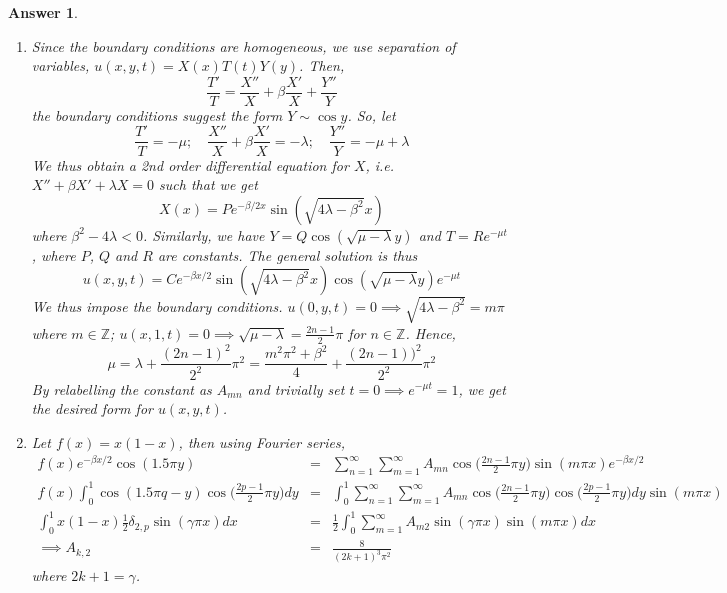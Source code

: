 \documentclass[a4paper]{article}
\newtheorem{ans}{Answer}[section]
\theoremstyle{new}
\begin{document}
\begin{ans}\leavevmode
\begin{enumerate}[label=(\alph*)]
    \item Since the boundary conditions are homogeneous, we use separation of variables, $u(x,y,t)=X(x)T(t)Y(y)$. Then,
$$\frac{T'}{T}=\frac{X''}{X}+\beta\frac{X'}{X}+\frac{Y''}{Y}$$
the boundary conditions suggest the form $Y\sim\cos y$. So, let
$$\frac{T'}{T}=-\mu;\quad \frac{X''}{X}+\beta\frac{X'}{X}=-\lambda;\quad \frac{Y''}{Y}=-\mu+\lambda$$
We thus obtain a 2nd order differential equation for $X$, i.e. $X''+\beta X'+\lambda X=0$ such that we get
$$X(x)=Pe^{-\beta/2x}\sin(\sqrt{4\lambda-\beta^2}x)$$
where $\beta^2-4\lambda<0$. Similarly, we have $Y=Q\cos(\sqrt{\mu-\lambda}y)$ and $T=Re^{-\mu t}$, where $P$, $Q$ and $R$ are constants. The general solution is thus
$$u(x,y,t)=Ce^{-\beta x/2}\sin(\sqrt{4\lambda-\beta^2}x)\cos(\sqrt{\mu-\lambda}y)e^{-\mu t}$$
We thus impose the boundary conditions. $u(0,y,t)=0\implies\sqrt{4\lambda-\beta^2}=m\pi$ where $m\in\mathbb{Z}$; $u(x,1,t)=0\implies\sqrt{\mu-\lambda}=\frac{2n-1}{2}\pi$ for $n\in\mathbb{Z}$. Hence, $$\mu=\lambda+\frac{(2n-1)^2}{2^2}\pi^2=\frac{m^2\pi^2+\beta^2}{4}+\frac{(2n-1))^2}{2^2}\pi^2$$ By relabelling the constant as $A_{mn}$ and trivially set $t=0\implies e^{-\mu t}=1$, we get the desired form for $u(x,y,t)$.
\item Let $f(x)=x(1-x)$, then using Fourier series,
\begin{eqnarray}
f(x)e^{-\beta x/2}\cos(1.5\pi y)&=&\sum_{n=1}^\infty\sum_{m=1}^\infty A_{mn}\cos\bigg(\frac{2n-1}{2}\pi y\bigg)\sin(m\pi x)e^{-\beta x/2}\nonumber\\
f(x)\int_0^1\cos(1.5\pi q-y)\cos\bigg(\frac{2p-1}{2}\pi y\bigg)dy&=&\int_0^1\sum_{n=1}^\infty\sum_{m=1}^\infty A_{mn}\cos\bigg(\frac{2n-1}{2}\pi y\bigg)\cos\bigg(\frac{2p-1}{2}\pi y\bigg)dy\sin(m\pi x)\nonumber\\
\int_0^1x(1-x)\frac{1}{2}\delta_{2,p}\sin(\gamma\pi x)dx&=&\frac{1}{2}\int_0^1\sum_{m=1}^\infty A_{m2}\sin(\gamma \pi x)\sin(m\pi x)dx\nonumber\\\implies A_{k,2}&=&\frac{8}{(2k+1)^3\pi^2}\nonumber
\end{eqnarray}
where $2k+1=\gamma$.
\end{enumerate}
\end{ans}
\newpage
\end{document}
